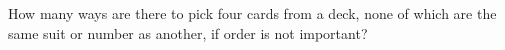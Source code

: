 How many ways are there to pick four cards from a deck, none of which are the same suit or number as another, if order is not important?
